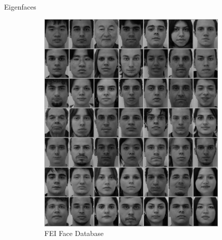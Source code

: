 \begin{frame}{Eigenfaces}

\begin{figure}[htbp]
    \centering
    \label{fig:eigenfaces_faces}
    \begin{subfigure}[t]{0.3\textwidth}
    \centering
    \includegraphics[width=\textwidth]{imagens/faces_fei.jpg}
    \caption{FEI Face Database}
    \end{subfigure}
    \begin{subfigure}[t]{0.3\textwidth}
    \centering

\end{subfigure}
\end{figure}
\end{frame}

